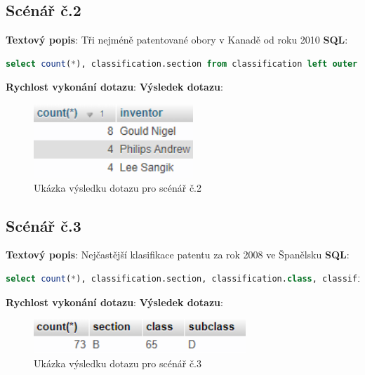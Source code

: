 \subsection{Scénář č.2}
\textbf{Textový popis}: Tři nejméně patentované obory v Kanadě od roku 2010
\newline
\textbf{SQL}: 
\begin{lstlisting}[language=SQL, breaklines=true, frame=single, label = {lst:elements_a}, captionpos=b]
select count(*), classification.section from classification left outer join patents on patents.id = classification.id_patent where YEAR(patents.patent_date) >= 2010 and patents.patent_id like '%CA%' group by classification.section order by count(*) asc LIMIT 3;
\end{lstlisting}
\textbf{Rychlost vykonání dotazu}: 
\newline
\textbf{Výsledek dotazu}:
\begin{figure}[h!]
\centering
\includegraphics[width=6cm]{img/scenare/scenar_9}
\caption{Ukázka výsledku dotazu pro scénář č.2}
\label{fig:scenar2}
\end{figure}

\subsection{Scénář č.3}
\textbf{Textový popis}: Nejčastější klasifikace patentu za rok 2008 ve Španělsku
\newline
\textbf{SQL}: 
\begin{lstlisting}[language=SQL, breaklines=true, frame=single, label = {lst:elements_a}, captionpos=b]
select count(*), classification.section, classification.class, classification.subclass from classification left outer join patents on patents.id = classification.id_patent where YEAR(patents.patent_date) = 2008 and patents.patent_id LIKE '%ES%' group by classification.section, classification.class, classification.subclass order by count(*) desc LIMIT 1;
\end{lstlisting}
\textbf{Rychlost vykonání dotazu}: 
\newline
\textbf{Výsledek dotazu}:
\begin{figure}[h!]
\centering
\includegraphics[width=8cm]{img/scenare/scenar_3}
\caption{Ukázka výsledku dotazu pro scénář č.3}
\label{fig:scenar3}
\end{figure}

